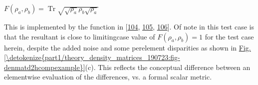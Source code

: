 \documentclass[letterpaper,table,10pt,english]{jupyterBook}
\begin{document}
\sphinxAtStartPar
\(F(\rho_{a},\rho_{b})=\operatorname{Tr} {\sqrt {{\sqrt {\rho_{a}}}\rho_{b} {\sqrt {\rho_{a}}}}}\)

\sphinxAtStartPar
This is implemented by the  function in  {[}\hyperlink{cite.backmatter/bibliography:id706}{104}, \hyperlink{cite.backmatter/bibliography:id707}{105}, \hyperlink{cite.backmatter/bibliography:id833}{106}{]}. Of note in this test case is that the resultant is close to limiting\sphinxhyphen{}case value of \(F(\rho_{a},\rho_{b})=1\) for the test case herein, despite the added noise and some per\sphinxhyphen{}element disparities as shown in   \hyperref[\detokenize{part1/theory_density_matrices_190723:fig-denmatd2hcompexample}]{Fig.\@ \ref{\detokenize{part1/theory_density_matrices_190723:fig-denmatd2hcompexample}}}(c). This reflects the conceptual difference between an element\sphinxhyphen{}wise evaluation of the differences, vs. a formal scalar metric.
\end{document}
